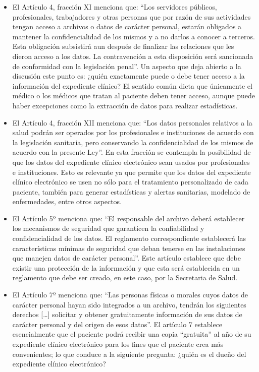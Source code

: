 \begin{itemize}
  \item El Artículo 4, fracción XI menciona que: “Los servidores públicos, profesionales, trabajadores y otras personas que por razón de sus actividades tengan acceso a archivos o datos de carácter personal, estarán obligados a mantener la confidencialidad de los mismos y a no darlos a conocer a terceros. Esta obligación subsistirá aun después de finalizar las relaciones que les dieron acceso a los datos. La contravención a esta disposición será sancionada de conformidad con la legislación penal”. Un aspecto que deja abierto a la discusión este punto es: ¿quién exactamente puede o debe tener acceso a la información del expediente clínico? El sentido común dicta que únicamente el médico o los médicos que tratan al paciente deben tener acceso, aunque puede haber excepciones como la extracción de datos para realizar estadísticas. \cite{marco2}
  \item El Artículo 4, fracción XII menciona que: “Los datos personales relativos a la salud podrán ser operados por los profesionales e instituciones de acuerdo con la legislación sanitaria, pero conservando la confidencialidad de los mismos de acuerdo con la presente Ley”. En esta fracción se contempla la posibilidad de que los datos del expediente clínico electrónico sean usados por profesionales e instituciones. Esto es relevante ya que permite que los datos del expediente clínico electrónico se usen no sólo para el tratamiento personalizado de cada paciente, también para generar estadísticas y alertas sanitarias, modelado de enfermedades, entre otros aspectos.\cite{marco2}
  \item El Artículo 5º menciona que: “El responsable del archivo deberá establecer los mecanismos de seguridad que garanticen la confiabilidad y confidencialidad de los datos. El reglamento correspondiente establecerá las características mínimas de seguridad que deban tenerse en las instalaciones que manejen datos de carácter personal”. Este artículo establece que debe existir una protección de la información y que esta será establecida en un reglamento que debe ser creado, en este caso, por la Secretaria de Salud. \cite{marco2}
  \item El Artículo 7º menciona que: “Las personas físicas o morales cuyos datos de carácter personal hayan sido integrados a un archivo, tendrán los siguientes derechos […] solicitar y obtener gratuitamente información de sus datos de carácter personal y del origen de esos datos”. El artículo 7 establece esencialmente que el paciente podrá recibir una copia “gratuita” al año de su expediente clínico electrónico para los fines que el paciente crea más convenientes; lo que conduce a la siguiente pregunta: ¿quién es el dueño del expediente clínico electrónico?

\end{itemize}
